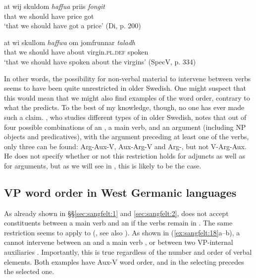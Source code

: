 \documentclass[output=paper, colorlinks, citecolor=brown]{langscibook}
\begin{document}
\ex\label{ex:sangfelt:17c}
\gll at wij skuldom \textit{haffua} {priis} \textit{fongit} \\
 that we should have price got\\
\glt ‘that we should have got a price' (Di, p. 200)

\ex\label{ex:sangfelt:17d}
\gll at wi skullom \textit{haffwa} {om} {jomfrunnar} \textit{taladh} \\
 that we should have about virgin.\textsc{pl.def} spoken\\
\glt ‘that we should have spoken about the virgins’ (SpecV, p. 334)
\z 
\z 

In other words, the possibility for non-verbal material to intervene between verbs seems to have been quite unrestricted in older Swedish. One might suspect that this would mean that we might also find examples of the  word order, contrary to what the  predicts. To the best of my knowledge, though, no one has ever made such a claim. \citet[155, 158–160]{Petzell2011}, who studies different types of  in older Swedish, notes that out of four possible combinations of an , a main verb, and an argument (including NP objects and predicatives), with the argument preceding at least one of the verbs, only three can be found: Arg-Aux-V, Aux-Arg-V and Arg-, but not V-Arg-Aux. He does not specify whether or not this restriction holds for adjuncts as well as for arguments, but as we will see in , this is likely to be the case.

\subsection{VP word order in West Germanic languages}\label{sec:sangfelt:3.3}

As already shown in §§\ref{sec:sangfelt:1} and \ref{sec:sangfelt:2},  does not accept constituents between a main verb and an  if the verbs remain in . The same restriction seems to apply to  (\citealt[290--291]{Haider2010}, see also \citealt{Wurmbrand2004}). As shown in (\ref{ex:sangfelt:18}a–b), a  cannot intervene between an  and a main verb , or between two VP-internal auxiliaries . Importantly, this is true regardless of the number and order of verbal elements. Both examples have Aux-V word order, and in  the selecting  precedes the selected one.
\end{document}
